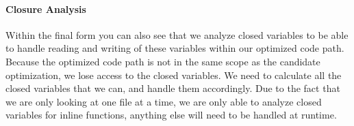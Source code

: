 \paragraph{Closure Analysis}
Within the final form you can also see that we analyze closed variables to be able to handle reading and writing of these variables within our optimized code path. Because the optimized code path is not in the same scope as the candidate optimization, we lose access to the closed variables.  We need to calculate all the closed variables that we can, and handle them accordingly.  Due to the fact that we are only looking at one file at a time, we are only able to analyze closed variables for inline functions, anything else will need to be handled at runtime.  

